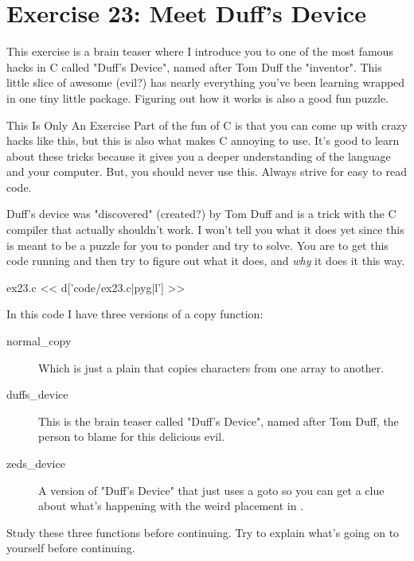 \chapter{Exercise 23: Meet Duff's Device}

This exercise is a brain teaser where I introduce you to one of the
most famous hacks in C called "Duff's Device", named after Tom Duff
the "inventor".  This little slice of awesome (evil?) has nearly everything
you've been learning wrapped in one tiny little package.  Figuring out
how it works is also a good fun puzzle.

\begin{aside}{This Is Only An Exercise}
Part of the fun of C is that you can come up with crazy hacks like this,
but this is also what makes C annoying to use.  It's good to learn about
these tricks because it gives you a deeper understanding of
the language and your computer.  But, you should never use this.  Always
strive for easy to read code.
\end{aside}

Duff's device was "discovered" (created?) by Tom Duff and is a trick
with the C compiler that actually shouldn't work.  I won't tell you what
it does yet since this is meant to be a puzzle for you to ponder and
try to solve.  You are to get this code running and then try to figure
out what it does, and \emph{why} it does it this way.

\begin{code}{ex23.c}
<< d['code/ex23.c|pyg|l'] >>
\end{code}

In this code I have three versions of a copy function:

\begin{description}
\item[normal\_copy] Which is just a plain  that copies
    characters from one array to another.
\item[duffs\_device] This is the brain teaser called "Duff's Device", named
    after Tom Duff, the person to blame for this delicious evil.
\item[zeds\_device] A version of "Duff's Device" that just uses a goto so
    you can get a clue about what's happening with the weird 
    placement in .
\end{description}

Study these three functions before continuing.  Try to explain what's
going on to yourself before continuing.


